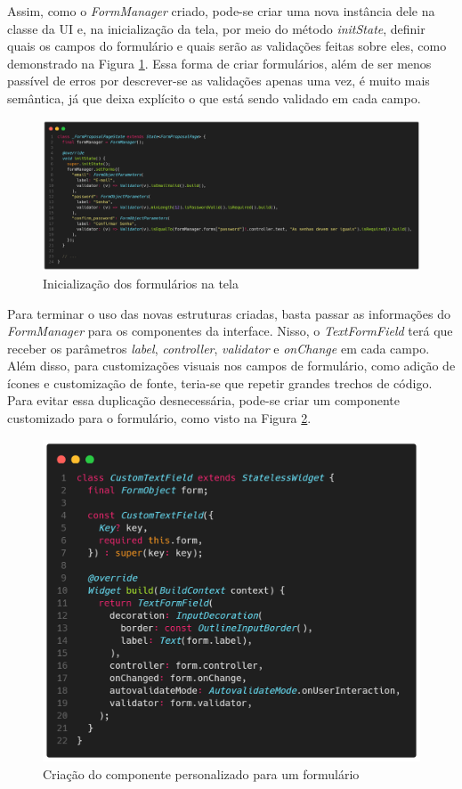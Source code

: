 \documentclass[12pt, %
openright, 
oneside, %
a4paper,    %
brazil]{facom-ufu-abntex2}
\begin{document}
Assim, como o \textit{FormManager} criado, pode-se criar uma nova instância dele na classe da UI e, na inicialização da tela, por meio do método \textit{initState}, definir quais os campos do formulário e quais serão as validações feitas sobre eles, como demonstrado na Figura \ref{fig:set_forms}. Essa forma de criar formulários, além de ser menos passível de erros por descrever-se as validações apenas uma vez, é muito mais semântica, já que deixa explícito o que está sendo validado em cada campo.

\begin{figure}[ht]
    \centering
    \includegraphics[width=1\textwidth, trim={0 30 0 100}, clip]{figures/forms/set_forms.png}
    \caption{Inicialização dos formulários na tela}
    \label{fig:set_forms}
\end{figure}

Para terminar o uso das novas estruturas criadas, basta passar as informações do \textit{FormManager} para os componentes da interface. Nisso, o \textit{TextFormField} terá que receber os parâmetros \textit{label}, \textit{controller}, \textit{validator} e \textit{onChange} em cada campo. Além disso, para customizações visuais nos campos de formulário, como adição de ícones e customização de fonte, teria-se que repetir grandes trechos de código. Para evitar essa duplicação desnecessária, pode-se criar um componente customizado para o formulário, como visto na Figura \ref{fig:custom_text_field}.

\begin{figure}[ht]
    \centering
    \includegraphics[width=.65\textwidth, trim={0 30 0 100}, clip]{figures/forms/custom_text_field.png}
    \caption{Criação do componente personalizado para um formulário}
    \label{fig:custom_text_field}
\end{figure}
\end{document}
